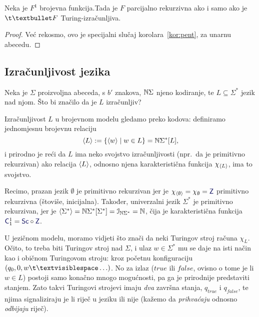 \begin{korolar}[{name=[unarno reprezentirane brojevne funkcije u različitim modelima]}]\label{kor:peuf}
Neka je $F^1$\! brojevna funkcija.\newline Tada je $F$ parcijalno rekurzivna ako i samo ako je $\t\textbullet F$ Turing-izračunljiva.
\end{korolar}
\begin{proof}
Već rekosmo, ovo je specijalni slučaj korolara~\ref{kor:pent}, za unarnu abecedu.
\end{proof}

\subsection{Izračunljivost jezika}\label{sec:Todl}

Neka je $\Sigma$ proizvoljna abeceda, s $b'$ znakova, ${\mathbb N}\Sigma$ njeno kodiranje, te $L\subseteq\Sigma^*$ jezik nad njom. Što bi značilo da je $L$ izračunljiv?

Izračunljivost $L$ u brojevnom modelu gledamo preko kodova: definiramo jednomjesnu brojevnu relaciju
\begin{equation}\label{eq:kodLdef}
    \langle L\rangle:=\{\langle w\rangle\mid w\in L\}={\mathbb N}\Sigma^*[L]\text,
\end{equation}
i prirodno je reći da $L$ ima neko svojstvo izračunljivosti (npr.\ da je primitivno rekurzivan) ako relacija $\langle L\rangle$, odnosno njena karakteristična funkcija $\chi_{\langle L\rangle}$, ima to svojstvo.

Recimo, prazan jezik $\emptyset$ je primitivno rekurzivan jer je $\chi_{\kr\emptyset}=\chi_\emptyset=\f Z$ primitivno rekurzivna (štoviše, inicijalna). Također, univerzalni jezik $\Sigma^*$ je primitivno rekurzivan, jer je $\langle\Sigma^*\rangle={\mathbb N}\Sigma^*[\Sigma^*]=\mathcal I_{{\mathbb N}\Sigma^*}={\mathbb N}$, čija je karakteristična funkcija $\f C_1^1=\f{Sc}\circ\f Z$.

U jezičnom modelu, moramo vidjeti što znači da neki Turingov stroj računa $\chi_L$. Očito, to treba biti Turingov stroj nad $\Sigma$, i ulaz $w\in\Sigma^*$ mu se daje na isti način kao i običnom Turingovom stroju: kroz početnu konfiguraciju $(q_0,0,w\bl\ldots)$. No za izlaz ($\mathit{true}$ ili $\mathit{false}$, ovisno o tome je li $w\in L$) postoji samo konačno mnogo mogućnosti, pa ga je prirodnije predstaviti stanjem. Zato takvi Turingovi strojevi imaju \emph{dva} završna stanja, $q_{\mathit{true}}$ i $q_{\mathit{false}}$, te njima signaliziraju je li riječ u jeziku ili nije (kažemo da \emph{prihvaćaju} odnosno \emph{odbijaju} riječ).


